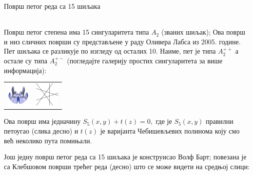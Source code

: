 \documentclass[sr]{./../../common/SurferDesc}%
\begin{document}
\footnotesize




\begin{surferPage}
  \begin{surferTitle}Површ петог реда са 15 шиљака\end{surferTitle}   \\
  Површ петог степена има 15 сингуларитета типа $A_2$
    (званих шиљак); Ова површ и низ сличних површи су представљене у  раду Оливера 
	Лабса из 2005. године.
    Пет шиљака се разликује по изгледу од осталих 10.
    Наиме, пет је типа $A_2^{++}$ а остале су типа $A_2^{+-}$ (погледајте галерију 
	простих сингуларитета за више информација):

     \vspace*{-0.3em}
    \begin{center}
      \begin{tabular}{c@{\qquad}c}
        \includegraphics[height=1.2cm]{./../../common/images/dessins_quint_15a2}
        &
        \includegraphics[height=1.2cm]{./../../common/images/rp5.pdf}
      \end{tabular}
    \end{center}
    \vspace*{-0.3em}    
    
    Ова површ има једначину  
    $S_5(x,y) + t(z)=0,$
    где је $S_5(x,y)$ правилни петоугао (слика десно) и $t(z)$ је варијанта 
	Чебишевљевих полинома коју смо већ неколико пута помињали.

     Још једну површ петог реда са 15 шиљака је конструисао Волф Барт; 
	 повезана је са Клебшовом површи трећег реда (десно) што се може видети на средњој слици:


\end{surferPage}
\end{document}
